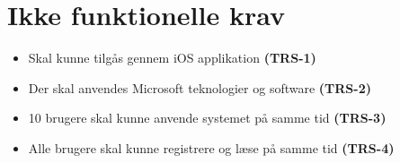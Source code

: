 \section{Ikke funktionelle krav} \label{sec:Ikkefunktionelle}
\begin{itemize}[-]
	\itemsep 0.3em 
	\item Skal kunne tilgås gennem iOS applikation \textbf{(TRS-1)}
	\item Der skal anvendes Microsoft teknologier og software \textbf{(TRS-2)}
	\item 10 brugere skal kunne anvende systemet på samme tid \textbf{(TRS-3)}
	\item Alle brugere skal kunne registrere og læse på samme tid \textbf{(TRS-4)}
\end{itemize}

\clearpage